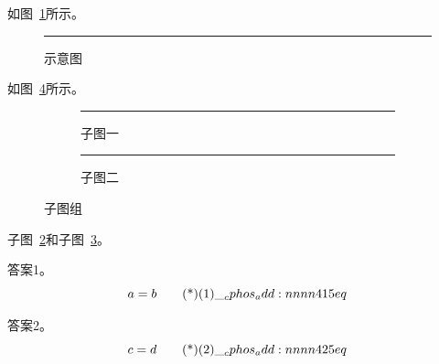 \documentclass[answer]{cphos}
\begin{document}
\begin{problem}[10]{}

\begin{problemstatement}
 如图~\ref{fig:demo}所示。

\begin{figure}[htbp]
\centering
\rule{3cm}{2cm}  %
\caption{示意图}\label{fig:demo}
\end{figure}

 如图~\ref{fig:sub}所示。

\begin{figure}[htbp]
\centering
\begin{subfigure}[b]{0.45\textwidth}
  \centering
  \rule{2cm}{1.5cm}
  \caption{子图一}\label{fig:suba}
\end{subfigure}
\hfill
\begin{subfigure}[b]{0.45\textwidth}
  \centering
  \rule{2cm}{1.5cm}
  \caption{子图二}\label{fig:subb}
\end{subfigure}
\caption{子图组}\label{fig:sub}
\end{figure}

子图~\ref{fig:suba}和子图~\ref{fig:subb}。
\end{problemstatement}

\begin{solution}
答案1。
\begin{equation}
    a = b \eqtagscore{1}{5}
\end{equation}

答案2。
\begin{equation}
    c = d \eqtagscore{2}{5}
\end{equation}
\scoring
\end{solution}
\end{problem}
\end{document}
